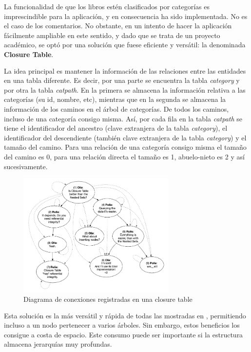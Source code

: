 \documentclass[a4paper,12pt,twoside,openright]{report}
\begin{document}
    La funcionalidad de que los libros estén clasificados por categorías es imprescindible para la aplicación, y en consecuencia ha sido implementada. No es el caso de los comentarios. No obstante, en un intento de hacer la aplicación fácilmente ampliable en este sentido, y dado que se trata de un proyecto académico, se optó por una solución que fuese eficiente y versátil: la denominada \textbf{Closure Table}.
    
    La idea principal es mantener la información de las relaciones entre las entidades en una tabla diferente. Es decir, por una parte se encuentra la tabla \emph{category} y por otra la tabla \emph{catpath}. En la primera se almacena la información relativa a las categorías (su id, nombre, etc), mientras que en la segunda se almacena la información de los caminos en el árbol de categorías. De todos los caminos, incluso de una categoría consigo misma. Así, por cada fila en la tabla \emph{catpath} se tiene el identificador del ancestro (clave extranjera de la tabla \emph{category}), el identificador del descendiente (también clave extranjera de la tabla \emph{category}) y el tamaño del camino. Para una relación de una categoría consigo misma el tamaño del camino es 0, para una relación directa el tamaño es 1, abuelo-nieto es 2 y así sucesivamente.
    
    \begin{figure}[htb!]
    	\centering
    	\includegraphics[width=0.7\textwidth]{closure_table}
    	\caption{Diagrama de conexiones registradas en una closure table}
    	\label{fig:closure_table}
    \end{figure}
    
    Esta solución es la más versátil y rápida de todas las mostradas en \cite{Karwin2010}, permitiendo incluso a un nodo pertenecer a varios árboles. Sin embargo, estos beneficios los consigue a costa de espacio. Este consumo puede ser importante si la estructura almacena jerarquías muy profundas.
    
\end{document}

